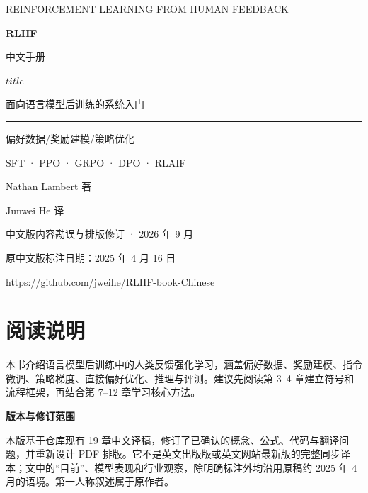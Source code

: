 \documentclass[UTF8,a4paper,11pt,openany,oneside,fontset=fandol]{ctexbook}
\newif\ifbookcover
\begin{document}
\frontmatter
\hypersetup{pageanchor=false}
\begin{titlepage}
\pagecolor{ink}\color{white}
\hypersetup{urlcolor=white}
\thispagestyle{empty}
\vspace*{12mm}
{\sffamily\large\color{cyan!35!white}REINFORCEMENT LEARNING FROM HUMAN FEEDBACK\par}
\vspace{24mm}
{\sffamily\fontsize{46}{56}\selectfont\bfseries\color{white}RLHF\par 中文手册\par}
\vspace{12mm}
{\Large\color{white}$title$\par}
\vspace{4mm}
{\large 面向语言模型后训练的系统入门\par}
\vspace{12mm}
{\color{cyan!35!white}\rule{42mm}{2pt}\par}
\vspace{12mm}
{\sffamily\large 偏好数据\quad /\quad 奖励建模\quad /\quad 策略优化\par}
\vspace{4mm}
{\sffamily\normalsize SFT · PPO · GRPO · DPO · RLAIF\par}
\vfill
{\large Nathan Lambert 著\par}
{\normalsize Junwei He 译\par}
\vspace{8mm}
{\small\color{white!75!ink}中文版内容勘误与排版修订 · 2026 年 9 月\par}
{\small\color{white!75!ink}原中文版标注日期：2025 年 4 月 16 日\par}
\vspace{6mm}
\url{https://github.com/jweihe/RLHF-book-Chinese}
\end{titlepage}
\bookcoverfalse
\pagecolor{white}\color{black}
\hypersetup{urlcolor=accent}
\hypersetup{pageanchor=true}
\chapter*{阅读说明}
本书介绍语言模型后训练中的人类反馈强化学习，涵盖偏好数据、奖励建模、指令微调、策略梯度、直接偏好优化、推理与评测。建议先阅读第 3--4 章建立符号和流程框架，再结合第 7--12 章学习核心方法。

\medskip
\noindent\textbf{版本与修订范围}\par
本版基于仓库现有 19 章中文译稿，修订了已确认的概念、公式、代码与翻译问题，并重新设计 PDF 排版。它不是英文出版版或英文网站最新版的完整同步译本；文中的“目前”、模型表现和行业观察，除明确标注外均沿用原稿约 2025 年 4 月的语境。第一人称叙述属于原作者。
\end{document}
